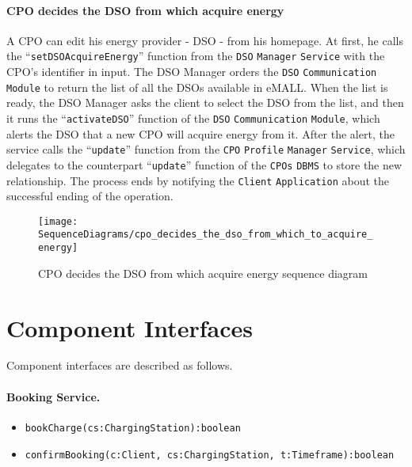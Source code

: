 \paragraph{CPO decides the DSO from which acquire energy}
A CPO can edit his energy provider - DSO - from his homepage.
At first, he calls the ``\verb|setDSOAcquireEnergy|'' function from the \verb|DSO| \verb|Manager| \verb|Service| with the CPO's identifier in input.
The DSO Manager orders the \verb|DSO| \verb|Communication| \verb|Module| to return the list of all the DSOs available in eMALL\@.
When the list is ready, the DSO Manager asks the client to select the DSO from the list, and then it runs the ``\verb|activateDSO|'' function of the \verb|DSO| \verb|Communication| \verb|Module|, which alerts the DSO that a new CPO will acquire energy from it.
After the alert, the service calls the ``\verb|update|'' function from the \verb|CPO| \verb|Profile| \verb|Manager| \verb|Service|, which delegates to the counterpart ``\verb|update|'' function of the \verb|CPOs| \verb|DBMS| to store the new relationship.
The process ends by notifying the \verb|Client| \verb|Application| about the successful ending of the operation.
\begin{figure}[H]
    \begin{center}
        \texttt{[image: SequenceDiagrams/cpo\_decides\_the\_dso\_from\_which\_to\_acquire\_energy]}
        \caption{CPO decides the DSO from which acquire energy sequence diagram}
        \label{cpo_decides_dso_from_which_acquire_energy}
    \end{center}
\end{figure}

\newpage


\section{Component Interfaces}
\label{sec: component_interfaces}%
Component interfaces are described as follows.

\paragraph{Booking Service.}
\begin{itemize}
    \item \verb|bookCharge(cs:ChargingStation):boolean|
    \item \verb|confirmBooking(c:Client, cs:ChargingStation, t:Timeframe):boolean|
\end{itemize}


